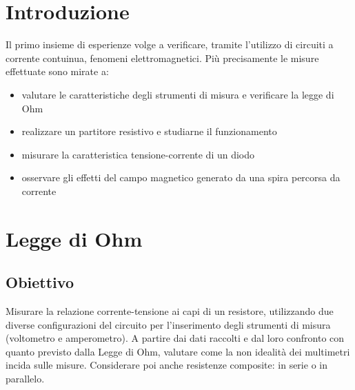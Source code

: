 \documentclass[a4paper]{article}
\begin{document}
\section{Introduzione}
Il primo insieme di esperienze volge a verificare, tramite l'utilizzo di circuiti a
corrente contuinua, fenomeni elettromagnetici. Più precisamente le misure effettuate sono mirate a:
\begin{itemize}
	\item valutare le caratteristiche degli strumenti di misura e verificare la legge di Ohm
	\item realizzare un partitore resistivo e studiarne il funzionamento
	\item misurare la caratteristica tensione-corrente di un diodo
	\item osservare gli effetti del campo magnetico generato da una spira percorsa da corrente

\end{itemize}

\section{Legge di Ohm}
\subsection{Obiettivo}
Misurare la relazione corrente-tensione ai capi di un resistore, utilizzando due diverse configurazioni del circuito per l'inserimento degli strumenti di misura
(voltometro e amperometro). A partire dai dati raccolti e dal loro confronto con quanto previsto dalla Legge di Ohm, valutare come la non idealità dei multimetri incida sulle misure.
Considerare poi anche resistenze composite: in serie o in parallelo.
\end{document}
